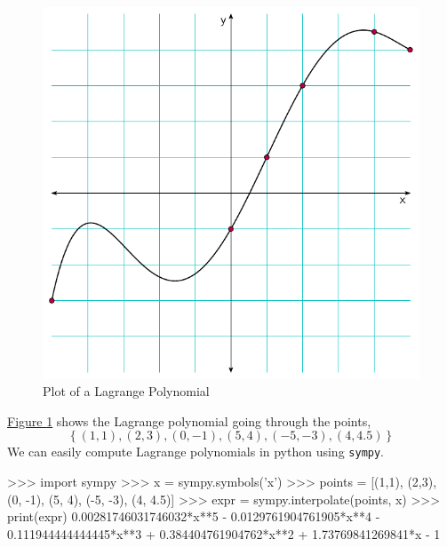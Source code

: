 \documentclass[11pt,numbers=noenddot,svgnames,dvipsnames]{scrartcl}
\begin{document}
\begin{figure}[!htpb]
\centering
\includegraphics[scale=0.75]{figures/lagrange_poly_plot1.pdf}
\caption{Plot of a Lagrange Polynomial}
\label{fig:lagrange_poly_plot1}
\end{figure}

\hyperref[fig:lagrange_poly_plot1]{Figure \ref{fig:lagrange_poly_plot1}} shows the Lagrange polynomial going through 
the points, 
\[ \left\{(1,1), (2,3), (0, -1), (5, 4), (-5, -3), (4, 4.5) \right\}\] 
We can easily compute Lagrange polynomials in python using \texttt{sympy}.

\begin{pycon}
>>> import sympy
>>> x = sympy.symbols('x')
>>> points = [(1,1), (2,3), (0, -1), (5, 4), (-5, -3), (4, 4.5)]
>>> expr = sympy.interpolate(points, x)
>>> print(expr)
0.00281746031746032*x**5 - 0.0129761904761905*x**4 - 0.111944444444445*x**3 + 0.384404761904762*x**2 + 1.73769841269841*x - 1
\end{pycon}
\end{document}
